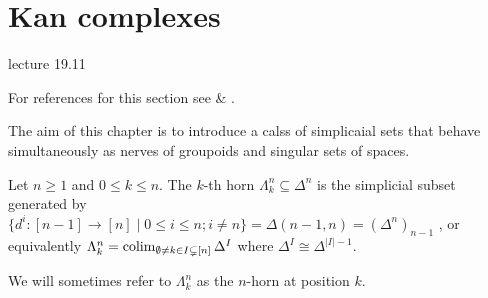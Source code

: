 \section{Kan complexes}

lecture 19.11

For references for this section see \cite[Section I.3]{GoerSimp1999} \& \cite[Section 1.2.5]{kerodon}.

The aim of this chapter is to introduce a calss of simplicaial sets that behave simultaneously as nerves of groupoids and singular sets of spaces.

\begin{defi}
    Let $n \geq 1$ and $ 0 \leq k \leq n$.
    The $k$-th horn $\Lambda_k^n \subseteq \Delta^n$ is the simplicial subset generated by $\{ d^i \colon [n-1] \to [n] \mid 0 \leq i \leq n ; i \neq n \} = \Delta ( n-1,n) = (\Delta^n)_{n-1}$ , or equivalently $\Lambda_k^n = \operatorname{colim}_{\emptyset \neq k \in I \subsetneq [n]}\Delta^I$ where $\Delta^I \cong \Delta^{\lvert I \rvert -1}$.
\end{defi}

\begin{rmk}
    We will sometimes refer to $\Lambda_k^n$ as the $n$-horn at position $k$.     
\end{rmk}

